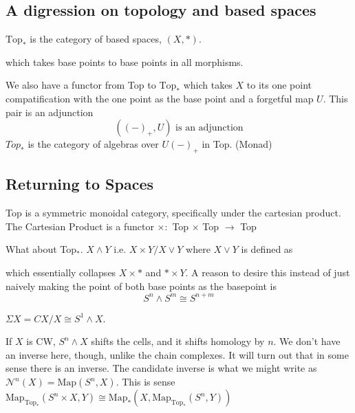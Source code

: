 \documentclass[12pt]{article}
\theoremstyle{definition}
\begin{document}
	\subsection{A digression on topology and based spaces}
	$\text{Top}_\ast$ is the category of based spaces, $(X,\ast)$. 
	\begin{center}
	\end{center}
	which takes base points to base points in all morphisms. 
	
	We also have a functor from Top to $\text{Top}_\ast$ which takes $X$ to its one point compatification with the one point as the base point and a forgetful map $U$. This pair is an adjunction\[
	((-)_+,U) \text{ is an adjunction} 
	\]
	$Top_*$ is the category of algebras over $U(-)_+$ in Top.  (Monad)
	
	\subsection{Returning to Spaces}
	Top is a symmetric monoidal category, specifically under the cartesian product. The Cartesian Product is a functor $\times:$ Top $\times$ Top $\to$ Top
	
	What about Top$_\ast$.  $X\wedge Y$ i.e. $X\times Y/X\vee Y$ where $X\vee Y$ is defined as \begin{center}
	\end{center}
	which essentially collapses $X\times \ast$ and $\ast\times Y$. A reason to desire this instead of just naively making the point of both base points as the basepoint is \[
	S^n\wedge S^m\cong S^{n+m}
	\]
	
	$\Sigma X=CX/X\cong S^1\wedge X$. 
	
	If $X$ is CW, $S^n\wedge X$ shifts the cells, and it shifts homology by $n$. We don't have an inverse here, though, unlike the chain complexes. It will turn out that in some sense there is an inverse. The candidate inverse is what we might write as $\mathcal{N}^n(X)=\text{Map}(S^n,X)$. This is sense $\text{Map}_{\text{Top}_\ast}(S^n\times X, Y)\cong \text{Map}_{\ast}(X,\text{Map}_{\text{Top}_\ast}(S^n,Y))$
\end{document}
